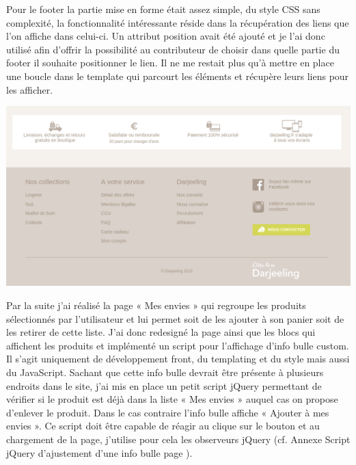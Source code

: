 \documentclass[a4paper,11pt,twoside]{report}
\begin{document}
	Pour le footer la partie mise en forme était assez simple, du style CSS sans complexité, la fonctionnalité intéressante réside dans la récupération des liens que l'on affiche dans celui-ci. Un attribut position avait été ajouté et je l'ai donc utilisé afin d'offrir la possibilité au contributeur de choisir dans quelle partie du footer il souhaite positionner le lien. Il ne me restait plus qu'à mettre en place une boucle dans le template qui parcourt les éléments et récupère leurs liens pour les afficher.
	\label{footer_recuperation_darjeeling}
	
	
	\begin{center}
	  \includegraphics[width=\textwidth]{images/darjeeling_footer.png} 
	  \label{darjeeling_footer}
	\end{center}
	
	Par la suite j'ai réalisé la page « Mes envies » qui regroupe les produits sélectionnés par l'utilisateur et lui permet soit de les ajouter à son panier soit de les retirer de cette liste. J'ai donc redesigné la page ainsi que les blocs qui affichent les produits et implémenté un script pour l'affichage d'info bulle custom. Il s'agit uniquement de développement front, du templating et du style mais aussi du JavaScript. Sachant que cette info bulle devrait être présente à plusieurs endroits dans le site, j'ai mis en place un petit script jQuery permettant de vérifier si le produit est déjà dans la liste « Mes envies » auquel cas on propose d'enlever le produit. Dans le cas contraire l'info bulle affiche « Ajouter à mes envies ». Ce script doit être capable de réagir au clique sur le bouton et au chargement de la page, j'utilise pour cela les observeurs jQuery (cf. Annexe Script jQuery d'ajustement d'une info bulle page \pageref{script_jQuery_d_ajustement_d_une_info_bulle}).
	
\end{document}
